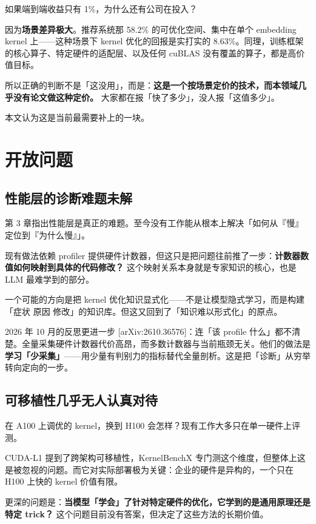 如果端到端收益只有 1\%，为什么还有公司在投入？


因为\textbf{场景差异极大}。推荐系统那 58.2\% 的可优化空间、集中在单个 embedding kernel 上——这种场景下 kernel 优化的回报是实打实的 8.63\%。同理，训练框架的核心算子、特定硬件的适配层、以及任何 cuBLAS 没有覆盖的算子，都是高价值目标。


所以正确的判断不是「这没用」，而是：\textbf{这是一个按场景定价的技术，而本领域几乎没有论文做这种定价。} 大家都在报「快了多少」，没人报「这值多少」。


本文认为这是当前最需要补上的一块。


\section{开放问题}

\subsection{性能层的诊断难题未解}

第 3 章指出性能层是真正的难题。至今没有工作能从根本上解决「如何从『慢』定位到『为什么慢』」。


现有做法依赖 profiler 提供硬件计数器，但这只是把问题往前推了一步：\textbf{计数器数值如何映射到具体的代码修改？} 这个映射关系本身就是专家知识的核心，也是 LLM 最难学到的部分。


一个可能的方向是把 kernel 优化知识显式化——不是让模型隐式学习，而是构建「症状  原因  修改」的知识库。但这又回到了「知识难以形式化」的原点。


2026 年 10 月的反思更进一步 [arXiv:2610.36576]：连「该 profile 什么」都不清楚。全量采集硬件计数器代价高昂，而多数计数器与当前瓶颈无关。他们的做法是\textbf{学习「少采集」}——用少量有判别力的指标替代全量剖析。这是把「诊断」从穷举转向定向的一步。


\subsection{可移植性几乎无人认真对待}

在 A100 上调优的 kernel，换到 H100 会怎样？现有工作大多只在单一硬件上评测。


CUDA-L1 提到了跨架构可移植性，KernelBenchX 专门测这个维度，但整体上这是被忽视的问题。而它对实际部署极为关键：企业的硬件是异构的，一个只在 H100 上快的 kernel 价值有限。


更深的问题是：\textbf{当模型「学会」了针对特定硬件的优化，它学到的是通用原理还是特定 trick？} 这个问题目前没有答案，但决定了这些方法的长期价值。


